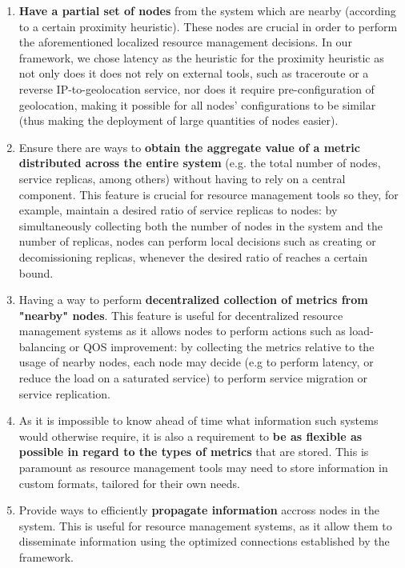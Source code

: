 \begin{enumerate} \label{enum:demmon}

    \item \textbf{Have a partial set of nodes} from the system which are nearby (according to a certain proximity heuristic). These nodes are crucial in order to perform the aforementioned localized resource management decisions. In our framework, we chose latency as the heuristic for the proximity heuristic as not only does it does not rely on external tools, such as traceroute or a reverse IP-to-geolocation service, nor does it require pre-configuration of geolocation, making it possible for all nodes' configurations to be similar (thus making the deployment of large quantities of nodes easier). \label{enum:demmon_1}
    
    \item Ensure there are ways to \textbf{obtain the aggregate value of a metric distributed across the entire system} (e.g. the total number of nodes, service replicas, among others) without having to rely on a central component. This feature is crucial for resource management tools so they, for example, maintain a desired ratio of service replicas to nodes: by simultaneously collecting both the number of nodes in the system and the number of replicas, nodes can perform local decisions such as creating or decomissioning replicas, whenever the desired ratio of reaches a certain bound. \label{enum:demmon_2}
    
    \item Having a way to perform \textbf{decentralized collection of metrics from "nearby" nodes}. This feature is useful for decentralized resource management systems as it allows nodes to perform actions such as load-balancing or QOS improvement: by collecting the metrics relative to the usage of nearby nodes, each node may decide (e.g to perform latency, or reduce the load on a saturated service) to perform service migration or service replication. \label{enum:demmon_3}
    
    \item As it is impossible to know ahead of time what information such systems would otherwise require, it is also a requirement to \textbf{be as flexible as possible in regard to the types of metrics} that are stored. This is paramount as resource management tools may need to store information in custom formats, tailored for their own needs. \label{enum:demmon_4}
    
    \item Provide ways to efficiently \textbf{propagate information} accross nodes in the system. This is useful for resource management systems, as it allow them to disseminate information using the optimized connections established by the framework. \label{enum:demmon_5}
    

\end{enumerate}

